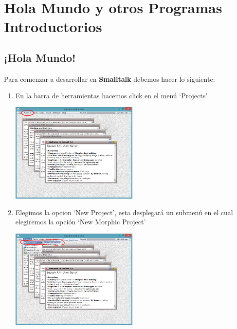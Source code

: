 \documentclass[11pt]{article}
\begin{document}
\section{\textbf{Hola Mundo y otros Programas Introductorios}}
\subsection{\textbf{¡Hola Mundo!}}
\paragraph{}\noindent
Para comenzar a desarrollar en \textbf{Smalltalk} debemos hacer lo siguiente:
\begin{enumerate}
\item
En la barra de herramientas hacemos click en el menú `Projects'
				\begin{center}
				\includegraphics[width=0.5\textwidth]{images/barra_herramientas}
				\end{center}

\item
Elegimos la opcion `New Project', esta desplegará un submenú en el cual elegiremos la opción `New Morphic Project'
				\begin{center}
				\includegraphics[width=0.5\textwidth]{images/new_project}
				\end{center}


\end{enumerate}
\end{document}
